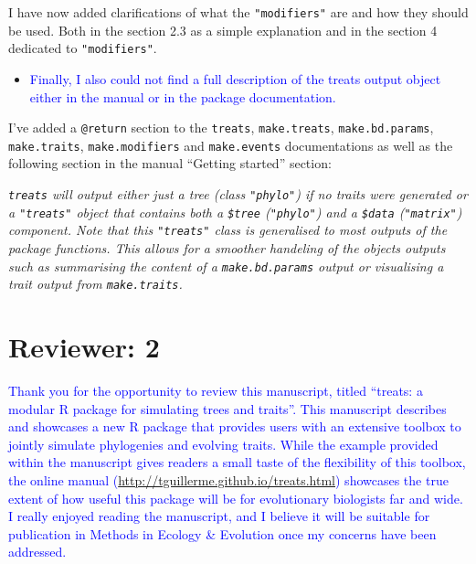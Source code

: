 \documentclass[
]{article}
\providecommand{\tightlist}{%
  \setlength{\itemsep}{0pt}\setlength{\parskip}{0pt}}
\begin{document}
I have now added clarifications of what the \texttt{"modifiers"} are and
how they should be used. Both in the section 2.3 as a simple explanation
and in the section 4 dedicated to \texttt{"modifiers"}.

\begin{itemize}
\tightlist
\item
  \textcolor{blue}{Finally, I also could not find a full description of the treats
  output object either in the manual or in the package documentation.}
\end{itemize}

I've added a \texttt{@return} section to the \texttt{treats},
\texttt{make.treats}, \texttt{make.bd.params}, \texttt{make.traits},
\texttt{make.modifiers} and \texttt{make.events} documentations as well
as the following section in the manual ``Getting started'' section:

\emph{\texttt{treats} will output either just a tree (class
\texttt{"phylo"}) if no traits were generated or a \texttt{"treats"}
object that contains both a \texttt{\$tree} (\texttt{"phylo"}) and a
\texttt{\$data} (\texttt{"matrix"}) component. Note that this
\texttt{"treats"} class is generalised to most outputs of the package
functions. This allows for a smoother handeling of the objects outputs
such as summarising the content of a \texttt{make.bd.params} output or
visualising a trait output from \texttt{make.traits}.}

\hypertarget{reviewer-2}{%
\section{Reviewer: 2}\label{reviewer-2}}

\textcolor{blue}{Thank you for the opportunity to review this manuscript, titled
``treats: a modular R package for simulating trees and traits''. This
manuscript describes and showcases a new R package that provides users
with an extensive toolbox to jointly simulate phylogenies and evolving
traits. While the example provided within the manuscript gives readers a
small taste of the flexibility of this toolbox, the online manual
(\url{http://tguillerme.github.io/treats.html}) showcases the true
extent of how useful this package will be for evolutionary biologists
far and wide. I really enjoyed reading the manuscript, and I believe it
will be suitable for publication in Methods in Ecology \& Evolution once
my concerns have been addressed.}
\end{document}
